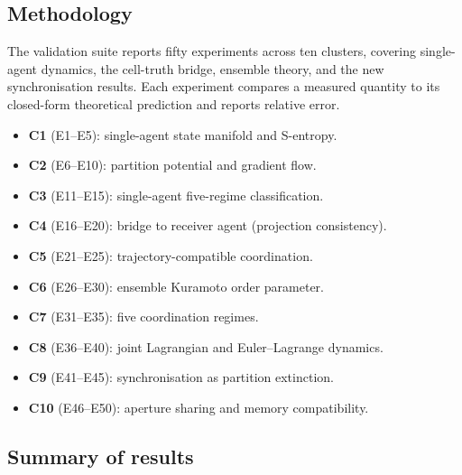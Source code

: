 \documentclass[11pt,twocolumn,a4paper]{article}
\begin{document}
\subsection{Methodology}

The validation suite reports fifty experiments across ten clusters,
covering single-agent dynamics, the cell-truth bridge, ensemble theory,
and the new synchronisation results. Each experiment compares a measured
quantity to its closed-form theoretical prediction and reports relative
error.

\begin{itemize}[leftmargin=*]
\item \textbf{C1} (E1--E5): single-agent state manifold and S-entropy.
\item \textbf{C2} (E6--E10): partition potential and gradient flow.
\item \textbf{C3} (E11--E15): single-agent five-regime classification.
\item \textbf{C4} (E16--E20): bridge to receiver agent (projection consistency).
\item \textbf{C5} (E21--E25): trajectory-compatible coordination.
\item \textbf{C6} (E26--E30): ensemble Kuramoto order parameter.
\item \textbf{C7} (E31--E35): five coordination regimes.
\item \textbf{C8} (E36--E40): joint Lagrangian and Euler--Lagrange dynamics.
\item \textbf{C9} (E41--E45): synchronisation as partition extinction.
\item \textbf{C10} (E46--E50): aperture sharing and memory compatibility.
\end{itemize}

\subsection{Summary of results}
\end{document}
